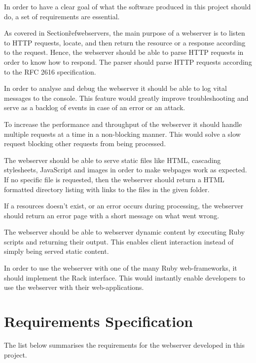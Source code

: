 
In order to have a clear goal of what the software produced in this project
should do, a set of requirements are essential. 

As covered in Section\~ref{webservers}, the main purpose of a webserver is to
listen to HTTP requests, locate, and then return the resource or a response
according to the request. Hence, the webserver should be able to parse HTTP
requests in order to know how to respond. The parser should parse HTTP
requests according to the RFC 2616 specification.

In order to analyse and debug the webserver it should be able to log vital
messages to the console. This feature would greatly improve troubleshooting
and serve as a backlog of events in case of an error or an attack.

To increase the performance and throughput of the webserver it should handle
multiple requests at a time in a non-blocking manner. This would solve a slow
request blocking other requests from being processed.

The webserver should be able to serve static files like HTML, cascading
stylesheets, JavaScript and images in order to make webpages work as expected.
If no specific file is requested, then the webserver should return a HTML
formatted directory listing with links to the files in the given folder.

If a resources doesn't exist, or an error occurs during processing, the
webserver should return an error page with a short message on what went wrong.

The webserver should be able to webserver dynamic content by executing Ruby
scripts and returning their output. This enables client interaction instead of
simply being served static content.

In order to use the webserver with one of the many Ruby web-frameworks, it
should implement the Rack interface. This would instantly enable developers to
use the webserver with their web-applications.

\section{Requirements Specification}
The list below summarises the requirements for the webserver developed in this
project.

